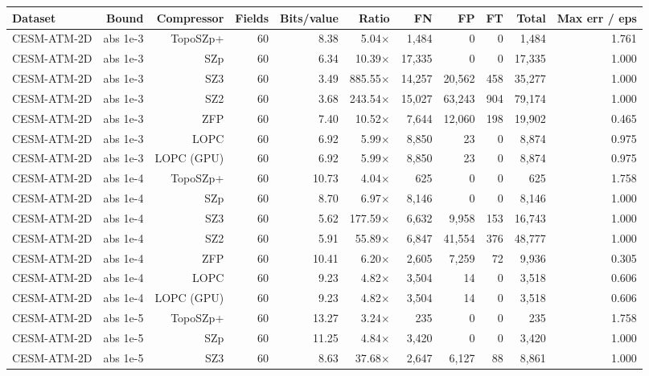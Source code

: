 \begin{tabular}{lrrrrrrrrrr}
\toprule
\textbf{Dataset} & \textbf{Bound} & \textbf{Compressor} & \textbf{Fields} & \textbf{Bits/value} & \textbf{Ratio} & \textbf{FN} & \textbf{FP} & \textbf{FT} & \textbf{Total} & \textbf{Max err / eps} \\
\midrule
CESM-ATM-2D & abs 1e-3 & TopoSZp+ & 60 & 8.38 & 5.04$\times$ & 1,484 & 0 & 0 & 1,484 & 1.761 \\
CESM-ATM-2D & abs 1e-3 & SZp & 60 & 6.34 & 10.39$\times$ & 17,335 & 0 & 0 & 17,335 & 1.000 \\
CESM-ATM-2D & abs 1e-3 & SZ3 & 60 & 3.49 & 885.55$\times$ & 14,257 & 20,562 & 458 & 35,277 & 1.000 \\
CESM-ATM-2D & abs 1e-3 & SZ2 & 60 & 3.68 & 243.54$\times$ & 15,027 & 63,243 & 904 & 79,174 & 1.000 \\
CESM-ATM-2D & abs 1e-3 & ZFP & 60 & 7.40 & 10.52$\times$ & 7,644 & 12,060 & 198 & 19,902 & 0.465 \\
CESM-ATM-2D & abs 1e-3 & LOPC & 60 & 6.92 & 5.99$\times$ & 8,850 & 23 & 0 & 8,874 & 0.975 \\
CESM-ATM-2D & abs 1e-3 & LOPC (GPU) & 60 & 6.92 & 5.99$\times$ & 8,850 & 23 & 0 & 8,874 & 0.975 \\
CESM-ATM-2D & abs 1e-4 & TopoSZp+ & 60 & 10.73 & 4.04$\times$ & 625 & 0 & 0 & 625 & 1.758 \\
CESM-ATM-2D & abs 1e-4 & SZp & 60 & 8.70 & 6.97$\times$ & 8,146 & 0 & 0 & 8,146 & 1.000 \\
CESM-ATM-2D & abs 1e-4 & SZ3 & 60 & 5.62 & 177.59$\times$ & 6,632 & 9,958 & 153 & 16,743 & 1.000 \\
CESM-ATM-2D & abs 1e-4 & SZ2 & 60 & 5.91 & 55.89$\times$ & 6,847 & 41,554 & 376 & 48,777 & 1.000 \\
CESM-ATM-2D & abs 1e-4 & ZFP & 60 & 10.41 & 6.20$\times$ & 2,605 & 7,259 & 72 & 9,936 & 0.305 \\
CESM-ATM-2D & abs 1e-4 & LOPC & 60 & 9.23 & 4.82$\times$ & 3,504 & 14 & 0 & 3,518 & 0.606 \\
CESM-ATM-2D & abs 1e-4 & LOPC (GPU) & 60 & 9.23 & 4.82$\times$ & 3,504 & 14 & 0 & 3,518 & 0.606 \\
CESM-ATM-2D & abs 1e-5 & TopoSZp+ & 60 & 13.27 & 3.24$\times$ & 235 & 0 & 0 & 235 & 1.758 \\
CESM-ATM-2D & abs 1e-5 & SZp & 60 & 11.25 & 4.84$\times$ & 3,420 & 0 & 0 & 3,420 & 1.000 \\
CESM-ATM-2D & abs 1e-5 & SZ3 & 60 & 8.63 & 37.68$\times$ & 2,647 & 6,127 & 88 & 8,861 & 1.000 \\

\end{tabular}

